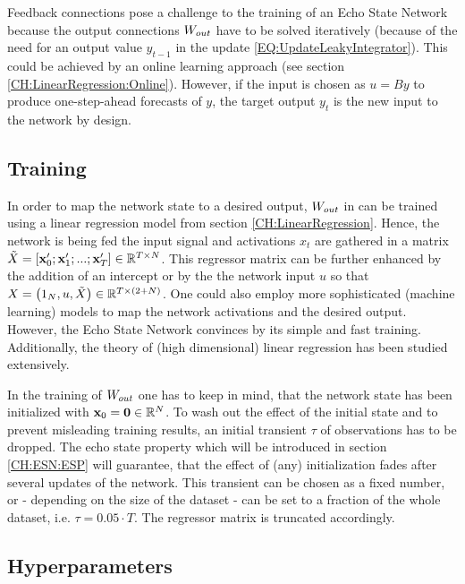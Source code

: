 Feedback connections pose a challenge to the training of an Echo State Network because the output connections $W_{out}$ have to be solved iteratively (because of the need for an output value $y_{t-1}$ in the update \ref{EQ:UpdateLeakyIntegrator}). This could be achieved by an online learning approach (see section \ref{CH:LinearRegression:Online}). However, if the input is chosen as $u = By$ to produce one-step-ahead forecasts of $y$, the target output $y_t$ is the new input to the network by design.

\subsection{Training}

In order to map the network state to a desired output, $W_{out}$ in  can be trained using a linear regression model from section \ref{CH:LinearRegression}.
Hence, the network is being fed the input signal and activations $x_t$ are gathered in a matrix $\tilde X = \left[{\bf x}_0'; {\bf x}_1'; ...; {\bf x}_T'\right] \in \mathbb{R}^{T\times N}$. This regressor matrix can be further enhanced by the addition of an intercept or by the the network input $u$ so that $X = \left(1_{N}, u, \tilde X\right) \in \mathbb{R}^{T\times(2+N)}$.
One could also employ more sophisticated (machine learning) models to map the network activations and the desired output. However, the Echo State Network convinces by its simple and fast training. Additionally, the theory of (high dimensional) linear regression has been studied extensively.

In the training of $W_{out}$ one has to keep in mind, that the network state has been initialized with ${\bf x}_0 = {\bf 0} \in \mathbb{R}^{N}$. To wash out the effect of the initial state and to prevent misleading training results, an initial transient $\tau$ of observations has to be dropped. The echo state property which will be introduced in section \ref{CH:ESN:ESP} will guarantee, that the effect of (any) initialization fades after several updates of the network. 
This transient can be chosen as a fixed number, or - depending on the size of the dataset - can be set to a fraction of the whole dataset, i.e. $\tau = 0.05\cdot T$. The regressor matrix is truncated accordingly.


\subsection{Hyperparameters}
\label{CH:ESN:Hyperparameters}

